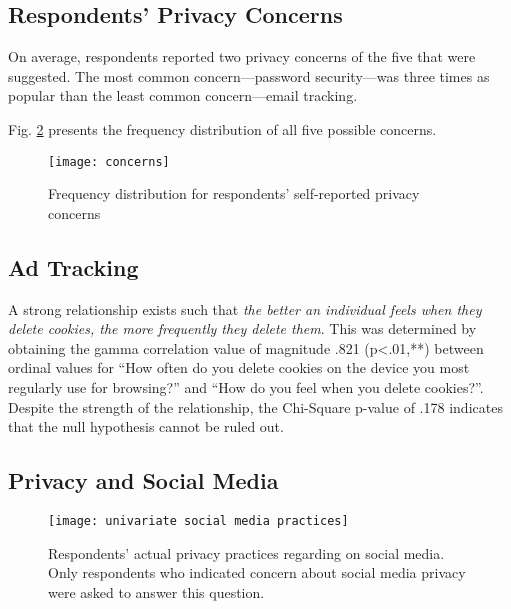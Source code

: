 \documentclass[acmtog]{acmart}
\begin{document}
\subsection{Respondents' Privacy Concerns}
On average, respondents reported two privacy concerns of the five that were
suggested. The most common concern---password security---was three times as
popular than the least common concern---email tracking.

Fig. \ref{Univariate Distribution Respondent Concerns} presents the frequency
distribution of all five possible concerns.

\begin{figure}[H]
    \texttt{[image: concerns]}
    \caption{Frequency distribution for respondents' self-reported privacy
    concerns}
    \label{Univariate Distribution Respondent Concerns}
\end{figure}

\subsection{Ad Tracking}
A strong relationship exists such that \emph{the better an individual feels when
they delete cookies, the more frequently they delete them}. This was determined
by obtaining the gamma correlation value of magnitude .821 (p<.01,**) between
ordinal values for ``How often do you delete cookies on the device you most
regularly use for browsing?'' and ``How do you feel when you delete cookies?''.
Despite the strength of the relationship, the Chi-Square p-value of .178
indicates that the null hypothesis cannot be ruled out.

\subsection{Privacy and Social Media}

\begin{figure}[H]
    \texttt{[image: univariate social media practices]}
    \caption{Respondents' actual privacy practices regarding on social media.
	Only respondents who indicated concern about social media privacy were
	asked to answer this question.}
    \label{Univariate Distribution Respondent Concerns}
\end{figure}



\appendix
\end{document}
